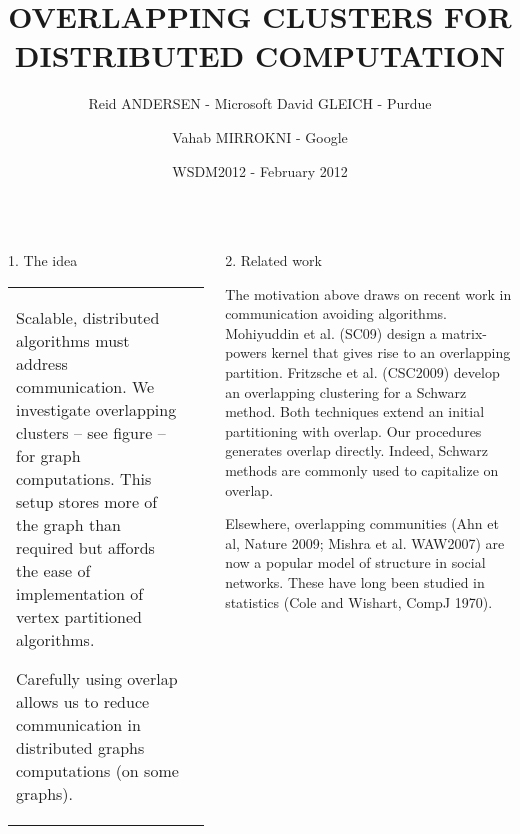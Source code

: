 \documentclass[final,hyperref={pdfpagelabels=true},t]{beamer}
\title[Fancy Posters]{%
  OVERLAPPING CLUSTERS FOR DISTRIBUTED COMPUTATION
}
\author[Please email David Gleich (dgleich@purdue.edu) for questions]{%
Reid ANDERSEN - Microsoft
David GLEICH - Purdue \and
Vahab MIRROKNI - Google}
\date{WSDM2012 - February 2012}
\renewcommand{\emph}[1]{\textcolor{accentlight}{#1}}
\begin{document}
\begin{frame}
\vspace{0.5\pageborder}

\begin{columns}

\begin{block}{1. The idea}
\RaggedRight

\begin{tabularx}{\linewidth}{U@{\quad}l}
Scalable, distributed algorithms must address
communication.  We investigate
\emph{overlapping clusters} -- see figure -- 
for graph computations. This setup 
stores more of the graph than required but 
affords the ease of implementation
of vertex partitioned algorithms. 
\begin{highlight}
 Carefully using overlap allows us
to reduce communication in distributed graphs
computations (on some graphs).
\end{highlight}
&

\end{tabularx}

\end{block}


\begin{block}{2. Related work}
\RaggedRight

The motivation above draws on recent work in
\emph{communication avoiding} algorithms.  Mohiyuddin 
et al. (SC09) design a matrix-powers kernel that gives rise to
an overlapping partition.  Fritzsche et al. (CSC2009) develop
an overlapping clustering for a Schwarz method.  \emph{Both techniques
extend an initial partitioning with overlap.  Our procedures
generates overlap directly.}  Indeed, Schwarz methods are commonly
used to capitalize on overlap.

Elsewhere, overlapping communities (Ahn et al, Nature 2009; 
Mishra et al. WAW2007) are now a popular model of 
structure in social networks.  These have long 
been studied in statistics (Cole and Wishart, CompJ 1970).



\end{block}
\end{columns}
\end{frame}
\end{document}
